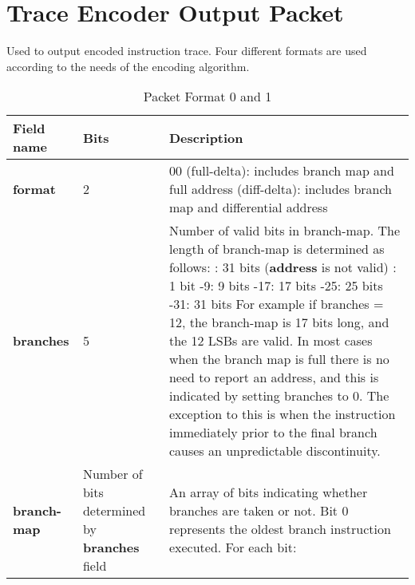 \chapter{Trace Encoder Output Packet}

Used to output encoded instruction trace.  Four different formats are used according to the needs of the encoding algorithm.

\begin{table}[htp]
    \centering
    \caption{Packet Format 0 and 1}
    \label{tab:te_inst0-1}
    \begin{tabulary}{\textwidth}{|l|p{35mm}|p{80mm}|}
        \hline
        {\bf Field name} & {\bf Bits} & {\bf Description} \\
        \hline
        \textbf{format}	& 2	& 00 (full-delta): includes branch map and full address  (diff-delta): includes branch map and differential address\\
        \hline
        \textbf{branches} & 5 & Number of valid bits in branch-map. The length of branch-map is determined as follows: :      31 bits (\textbf{address} is not valid) : 	1 bit -9: 	9 bits -17: 	17 bits -25: 	25 bits -31: 	31 bits \newline
        For example if branches = 12, the branch-map is 17 bits long, and the 12 LSBs are valid. \newline
        In most cases when the branch map is full there is no need to report an address,
        and this is indicated by setting branches to 0.  The exception to this is when 
        the instruction immediately prior to the final branch causes an unpredictable discontinuity.\\
        \hline
        \textbf{branch-map} & Number of bits \newline 
                     determined by \newline 
                     \textbf {branches} field & 
                     An array of bits indicating whether branches are taken or not.\newline
        Bit 0 represents the oldest branch instruction executed.   For each bit: \newline

\end{tabulary}
\end{table}
